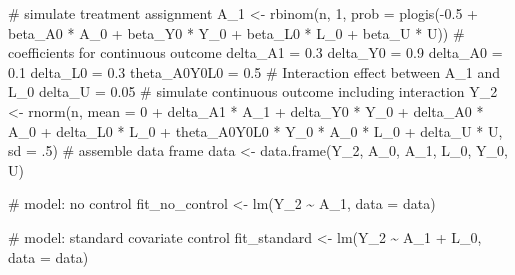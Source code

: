 \documentclass[
  singlecolumn]{article}
\newenvironment{Shaded}{}{}
\newcommand{\AttributeTok}[1]{\textcolor[rgb]{0.84,0.23,0.29}{#1}}
\newcommand{\CommentTok}[1]{\textcolor[rgb]{0.42,0.45,0.49}{#1}}
\newcommand{\DecValTok}[1]{\textcolor[rgb]{0.00,0.36,0.77}{#1}}
\newcommand{\FloatTok}[1]{\textcolor[rgb]{0.00,0.36,0.77}{#1}}
\newcommand{\FunctionTok}[1]{\textcolor[rgb]{0.44,0.26,0.76}{#1}}
\newcommand{\NormalTok}[1]{\textcolor[rgb]{0.14,0.16,0.18}{#1}}
\newcommand{\OtherTok}[1]{\textcolor[rgb]{0.44,0.26,0.76}{#1}}
\newcommand{\SpecialCharTok}[1]{\textcolor[rgb]{0.00,0.36,0.77}{#1}}
\begin{document}
\begin{Shaded}
\begin{Highlighting}[]
\CommentTok{\# simulate treatment assignment}
\NormalTok{A\_1 }\OtherTok{\textless{}{-}} \FunctionTok{rbinom}\NormalTok{(n, }\DecValTok{1}\NormalTok{, }\AttributeTok{prob =} \FunctionTok{plogis}\NormalTok{(}\SpecialCharTok{{-}}\FloatTok{0.5} \SpecialCharTok{+} 
\NormalTok{                                    beta\_A0 }\SpecialCharTok{*}\NormalTok{ A\_0 }\SpecialCharTok{+}
\NormalTok{                                    beta\_Y0 }\SpecialCharTok{*}\NormalTok{ Y\_0 }\SpecialCharTok{+} 
\NormalTok{                                    beta\_L0 }\SpecialCharTok{*}\NormalTok{ L\_0 }\SpecialCharTok{+} 
\NormalTok{                                    beta\_U }\SpecialCharTok{*}\NormalTok{ U))}
\CommentTok{\# coefficients for continuous outcome}
\NormalTok{delta\_A1 }\OtherTok{=} \FloatTok{0.3}
\NormalTok{delta\_Y0 }\OtherTok{=} \FloatTok{0.9}
\NormalTok{delta\_A0 }\OtherTok{=} \FloatTok{0.1}
\NormalTok{delta\_L0 }\OtherTok{=} \FloatTok{0.3}
\NormalTok{theta\_A0Y0L0 }\OtherTok{=} \FloatTok{0.5} \CommentTok{\# Interaction effect between A\_1 and L\_0}
\NormalTok{delta\_U }\OtherTok{=} \FloatTok{0.05}
\CommentTok{\# simulate continuous outcome including interaction}
\NormalTok{Y\_2 }\OtherTok{\textless{}{-}} \FunctionTok{rnorm}\NormalTok{(n,}
             \AttributeTok{mean =} \DecValTok{0} \SpecialCharTok{+}
\NormalTok{               delta\_A1 }\SpecialCharTok{*}\NormalTok{ A\_1 }\SpecialCharTok{+} 
\NormalTok{               delta\_Y0 }\SpecialCharTok{*}\NormalTok{ Y\_0 }\SpecialCharTok{+} 
\NormalTok{               delta\_A0 }\SpecialCharTok{*}\NormalTok{ A\_0 }\SpecialCharTok{+} 
\NormalTok{               delta\_L0 }\SpecialCharTok{*}\NormalTok{ L\_0 }\SpecialCharTok{+} 
\NormalTok{               theta\_A0Y0L0 }\SpecialCharTok{*}\NormalTok{ Y\_0 }\SpecialCharTok{*} 
\NormalTok{               A\_0 }\SpecialCharTok{*}\NormalTok{ L\_0 }\SpecialCharTok{+} 
\NormalTok{               delta\_U }\SpecialCharTok{*}\NormalTok{ U,}
             \AttributeTok{sd =}\NormalTok{ .}\DecValTok{5}\NormalTok{)}
\CommentTok{\# assemble data frame}
\NormalTok{data }\OtherTok{\textless{}{-}} \FunctionTok{data.frame}\NormalTok{(Y\_2, A\_0, A\_1, L\_0, Y\_0, U)}

\CommentTok{\# model: no control}
\NormalTok{fit\_no\_control }\OtherTok{\textless{}{-}} \FunctionTok{lm}\NormalTok{(Y\_2 }\SpecialCharTok{\textasciitilde{}}\NormalTok{ A\_1, }\AttributeTok{data =}\NormalTok{ data)}

\CommentTok{\# model: standard covariate control}
\NormalTok{fit\_standard }\OtherTok{\textless{}{-}} \FunctionTok{lm}\NormalTok{(Y\_2 }\SpecialCharTok{\textasciitilde{}}\NormalTok{ A\_1 }\SpecialCharTok{+}\NormalTok{ L\_0, }\AttributeTok{data =}\NormalTok{ data)}


\end{Highlighting}
\end{Shaded}
\end{document}
